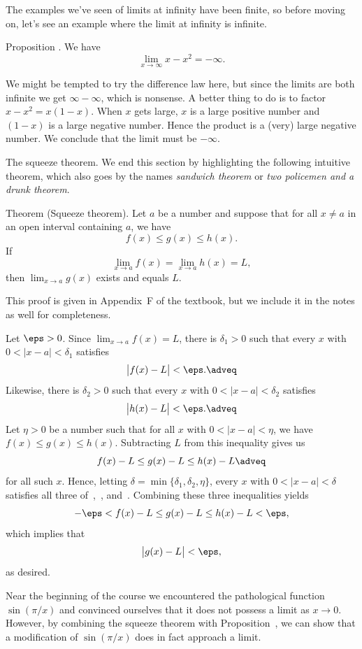 The examples we've seen of limits at infinity have been finite, so before moving on,
let's see an example where the limit at infinity is infinite.

\proclaim Proposition \advthm. We have
$$\lim_{x\to\infty} x-x^2 = -\infty.$$

\proof We might be tempted to try the difference law here, but since the limits are both infinite we get
$\infty-\infty$, which is nonsense. A better thing to do is to factor $x-x^2 = x(1-x)$. When $x$ gets
large, $x$ is a large positive number and $(1-x)$ is a large negative number. Hence the product
is a (very) large negative number. We conclude that the limit must be $-\infty$.\slug

\medskip\boldlabel The squeeze theorem.
We end this section by highlighting the following intuitive theorem, which also goes by the names
{\it sandwich theorem} or {\it two policemen and a drunk theorem}.

\parenproclaim Theorem {\advthm} (Squeeze theorem).
Let $a$ be a number and suppose that for all $x\ne a$ in an open interval containing $a$, we have
$$f(x) \le g(x) \le h(x).$$
If
$$\lim_{x\to a} f(x) =  \lim_{x\to a} h(x) = L,$$
then $\lim_{x\to a} g(x)$ exists and equals $L$.

\proof This proof is given in Appendix~F of the textbook, but we include it in the notes as well for
completeness.

Let $\eps > 0$. Since $\lim_{x\to a} f(x) = L$, there is $\delta_1 > 0$ such that every $x$ with
$0<|x-a|<\delta_1$ satisfies
\edef\eqsqueezeone{\the\eqcount}
$$\bigl| f(x) - L\bigr| <\eps.\adveq$$
Likewise, there is $\delta_2>0$ such that every $x$ with
$0<|x-a|<\delta_2$ satisfies
\edef\eqsqueezetwo{\the\eqcount}
$$\bigl| h(x) - L\bigr| <\eps.\adveq$$
Let $\eta>0$ be a number such that for all $x$ with $0<|x-a|<\eta$, we have $f(x)\le g(x)\le h(x)$.
Subtracting $L$ from this inequality gives us
\edef\eqsqueezethree{\the\eqcount}
$$f(x) -L \le g(x) - L \le h(x) - L\adveq$$
for all such $x$. Hence, letting $\delta = \min\{\delta_1,\delta_2,\eta\}$, every $x$ with
$0<|x-a|<\delta$ satisfies all three of~\refeq{\eqsqueezeone},~\refeq{\eqsqueezetwo},
and~\refeq{\eqsqueezethree}. Combining these three inequalities yields
$$-\eps < f(x) -L \le g(x) - L \le h(x) - L<\eps,$$
which implies that
$$\bigl|g(x) - L\bigr| < \eps,$$
as desired.\slug

Near the beginning of the course we encountered the pathological function $\sin(\pi/x)$ and convinced
ourselves that it does not possess a limit as $x\to 0$. However, by combining the squeeze theorem
with Proposition~{\proplimabs}, we can show that a modification of $\sin(\pi/x)$ does in fact approach a
limit.

